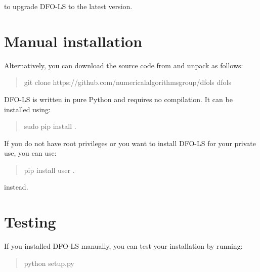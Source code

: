 \documentclass[letterpaper,10pt,english]{sphinxmanual}
\begin{document}
to upgrade DFO-LS to the latest version.


\section{Manual installation}
\label{\detokenize{install:manual-installation}}
Alternatively, you can download the source code from  and unpack as follows:
\begin{quote}

\begin{sphinxVerbatim}[commandchars=\\\{\}]
\PYGZdl{} git clone https://github.com/numericalalgorithmsgroup/dfols
\PYGZdl{}  dfols
\end{sphinxVerbatim}
\end{quote}

DFO-LS is written in pure Python and requires no compilation. It can be installed using:
\begin{quote}

\begin{sphinxVerbatim}[commandchars=\\\{\}]
\PYGZdl{} \PYG{o}{[}sudo\PYG{o}{]} pip install .
\end{sphinxVerbatim}
\end{quote}

If you do not have root privileges or you want to install DFO-LS for your private use, you can use:
\begin{quote}

\begin{sphinxVerbatim}[commandchars=\\\{\}]
\PYGZdl{} pip install \PYGZhy{}\PYGZhy{}user .
\end{sphinxVerbatim}
\end{quote}

instead.


\section{Testing}
\label{\detokenize{install:testing}}
If you installed DFO-LS manually, you can test your installation by running:
\begin{quote}

\begin{sphinxVerbatim}[commandchars=\\\{\}]
\PYGZdl{} python setup.py 
\end{sphinxVerbatim}
\end{quote}
\end{document}
